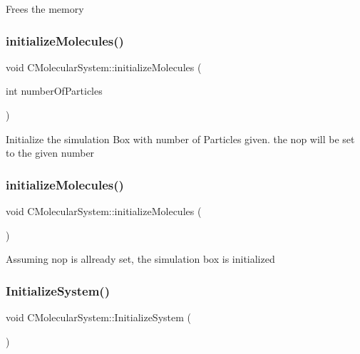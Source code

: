 Frees the memory \mbox{\label{classCMolecularSystem_afcebd0d1032cbe262c82825ceb78b4a5}} 
\subsubsection{\texorpdfstring{initialize\+Molecules()}{initializeMolecules()}\hspace{0.1cm}{\footnotesize\ttfamily [1/2]}}
{\footnotesize\ttfamily void C\+Molecular\+System\+::initialize\+Molecules (\begin{DoxyParamCaption}\item[{int}]{number\+Of\+Particles }\end{DoxyParamCaption})}

Initialize the simulation Box with number of Particles given. the nop will be set to the given number \mbox{\label{classCMolecularSystem_a3635729781d41229ce16fabea4ce9b6f}} 
\subsubsection{\texorpdfstring{initialize\+Molecules()}{initializeMolecules()}\hspace{0.1cm}{\footnotesize\ttfamily [2/2]}}
{\footnotesize\ttfamily void C\+Molecular\+System\+::initialize\+Molecules (\begin{DoxyParamCaption}{ }\end{DoxyParamCaption})}

Assuming nop is allready set, the simulation box is initialized \mbox{\label{classCMolecularSystem_a9084e19d4554f70ae7e603c7cab3a2ae}} 
\subsubsection{\texorpdfstring{Initialize\+System()}{InitializeSystem()}}
{\footnotesize\ttfamily void C\+Molecular\+System\+::\+Initialize\+System (\begin{DoxyParamCaption}{ }\end{DoxyParamCaption})}

